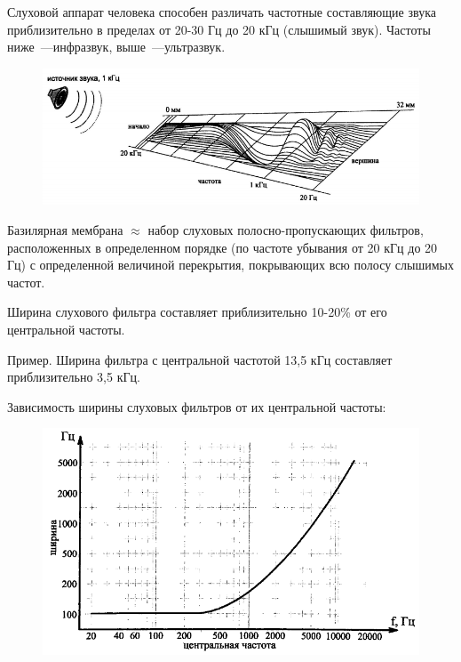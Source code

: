 \documentclass{beamer}
\begin{document}
\begin{frame}
Слуховой аппарат человека способен различать частотные составляющие звука приблизительно в пределах от 20-30 Гц до 20 кГц (слышимый звук).  Частоты ниже~---инфразвук, выше~---ультразвук.
\begin{figure}
\includegraphics[width=0.9\linewidth]{pic-ear-02}
\end{figure}
Базилярная мембрана $\approx$ набор слуховых полосно-пропускающих фильтров, расположенных в определенном порядке (по частоте убывания от 20 кГц до 20 Гц) с определенной величиной перекрытия, покрывающих всю полосу слышимых частот. 

Ширина слухового фильтра составляет приблизительно 10-20\% от его центральной частоты.
\end{frame}

\begin{frame}
Пример. Ширина фильтра с центральной частотой 13,5 кГц составляет приблизительно 3,5 кГц. 

Зависимость ширины слуховых фильтров от их центральной частоты:
\begin{figure}
\includegraphics[width=0.9\linewidth]{pic-ear-03}
\end{figure}
\end{frame}
\end{document}
